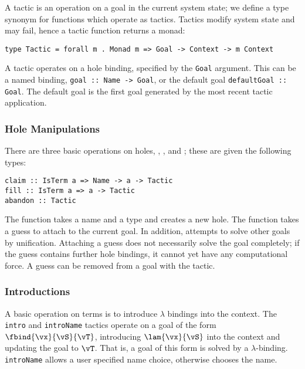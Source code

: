 A tactic is an operation on a goal in the current system state; we
define a type synonym  for functions which operate as
tactics. Tactics modify system state and may fail, hence a tactic
function returns a monad:

\begin{verbatim}
type Tactic = forall m . Monad m => Goal -> Context -> m Context
\end{verbatim}

A tactic operates on a hole binding, specified by the \texttt{Goal}
argument. This can be a named binding, \texttt{goal :: Name -> Goal},
or the default goal \texttt{defaultGoal :: Goal}. The default goal is
the first goal generated by the most recent tactic application.

\subsubsection{Hole Manipulations}
There are three basic operations on holes, , ,
and ; these are given the following types:

\begin{verbatim}
claim :: IsTerm a => Name -> a -> Tactic
fill :: IsTerm a => a -> Tactic
abandon :: Tactic
\end{verbatim}

The  function takes a name and a type and creates a new
hole. The  function takes a guess to attach to the current
goal. In addition,  attempts to solve other goals by
unification. Attaching a guess does not necessarily solve the goal
completely; if the guess contains further hole bindings, it cannot yet
have any computational force. 
A guess can be removed from a goal with the 
tactic.


\subsubsection{Introductions}
A basic operation on terms is to introduce $\lambda$ bindings into the
context. The \texttt{intro} and \texttt{introName} tactics operate on
a goal of the form $\fbind{\vx}{\vS}{\vT}$, introducing
$\lam{\vx}{\vS}$ into the context and updating the goal to
$\vT$. That is, a goal of this form is solved by a $\lambda$-binding.
\texttt{introName} allows a user specified name choice,
otherwise \Ivor{} chooses the name.

